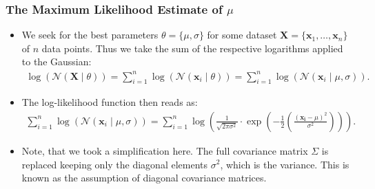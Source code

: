 \begin{frame}
	\frametitle{The Maximum Likelihood Estimate of $\mu$}
	\begin{itemize}
		\item We seek for the best parameters $\theta = \{\mu, \sigma\}$ for some dataset $\mathbf{X} = \{\mathbf{x}_1,\ldots,\mathbf{x}_n\}$ of $n$ data points. Thus we take the sum of the respective logarithms applied to the Gaussian:
		      \begin{align}
			      \log\left(\mathcal{N}(\mathbf{X} \; \vert \; \theta)\right) = \sum_{i=1}^{n} \log\left( \mathcal{N}(\mathbf{x}_i \; \vert \; \theta)\right) = \sum_{i=1}^{n} \log\left( \mathcal{N}(\mathbf{x}_i \; \vert \; \mu, \sigma)\right).
		      \end{align}
		\item The log-likelihood function then reads as:
		      \begin{align}
			      \sum_{i=1}^{n} \log\left(\mathcal{N}(\mathbf{x}_i \; \vert \; \mu, \sigma)\right) = \sum_{i=1}^{n} \log\left(\frac{1}{\sqrt{2\pi\sigma^2}} \cdot \exp \left( -\frac{1}{2} \left( \frac{(\mathbf{x_i}-\mu)^2}{\sigma^2} \right) \right)\right).
		      \end{align}
		\item Note, that we took a simplification here. The full covariance matrix $\Sigma$ is replaced keeping only the diagonal elements $\sigma^2$, which is the variance. This is known as the assumption of diagonal covariance matrices.
	\end{itemize}
\end{frame}


